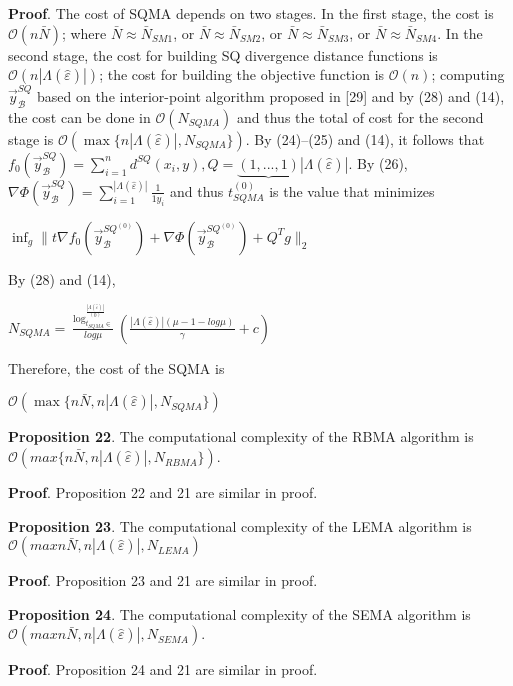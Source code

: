 \documentclass[10pt,a4paper]{IOS-Book-Article}
\begin{document}
\textbf{Proof}. The cost of SQMA depends on two stages. In
the first stage, the cost is $\mathcal{O}(n\bar N)$; where $\bar N \approx \bar N_{SM1}$, or $\bar N \approx \bar N_{SM2}$, or $\bar N \approx \bar N_{SM3}$, or $\bar N \approx \bar N_{SM4}$. In the
second stage, the cost for building SQ divergence distance
functions is $\mathcal{O}(n |\Lambda(\hat{\varepsilon})|)$; the cost for building
the objective function is $\mathcal{O}(n)$; computing $\vec{y}^{SQ}_\mathcal{B}$ based
on the interior-point algorithm proposed in [29] and
by (28) and (14), the cost can be done in $\mathcal{O}(N_{SQMA})$
and thus the total of cost for the second stage is
$\mathcal{O}(\max\{n |\Lambda(\hat{\varepsilon})|,N_{SQMA}\})$. By (24)–(25) and (14),
it follows that $f_0 \left( \vec{y}^{SQ}_\mathcal{B} \right) = \sum^n_{i=1} d^{SQ}(x_i, y), Q = \underbrace{(1, ... , 1)}{|\Lambda(\hat{\varepsilon})|}$. By (26), $\nabla \Phi \left( \vec{y}^{SQ}_\mathcal{B} \right) = \sum^{|\Lambda(\hat{\varepsilon})|}_{i=1} \frac{1}{1
y_i}$
and
thus $t^{(0)}_{SQMA}$ is the value that minimizes

$\inf_g\parallel t\nabla f_0 \left( \vec{y}^{SQ^{(0)}}_\mathcal{B} \right) +\nabla \Phi \left( \vec{y}^{SQ^{(0)}}_\mathcal{B} \right) + Q^T g \parallel_2$

By (28) and (14),

$N_{SQMA} =  \frac{ \log^{\frac{|\Lambda(\hat{\varepsilon})|}{(0)}}_{t_{SQMA} \in}}{log\mu}  \left( \frac{|\Lambda(\hat{\varepsilon})| (\mu − 1 − log\mu)}{\gamma} + c \right)$

Therefore, the cost of the SQMA is

$\mathcal{O}(\max\{n \bar N, n |\Lambda(\hat{\varepsilon})|,N_{SQMA}\})$

\textbf{Proposition 22}. The computational complexity of the RBMA algorithm is $\mathcal{O}(max\{n \bar N, n |\Lambda(\hat{\varepsilon})|,N_{RBMA}\})$.

\textbf{Proof}. Proposition 22 and 21 are similar in proof. 

\textbf{Proposition 23}. The computational complexity of the LEMA algorithm is $\mathcal{O}(max{n \bar N, n |\Lambda(\hat{\varepsilon})|,N_{LEMA}})$

\textbf{Proof}. Proposition 23 and 21 are similar in proof.

\textbf{Proposition 24}. The computational complexity of the
SEMA algorithm is $\mathcal{O}(max{n \bar N, n |\Lambda(\hat{\varepsilon})|,N_{SEMA}})$.

\textbf{Proof}. Proposition 24 and 21 are similar in proof.
\end{document}
